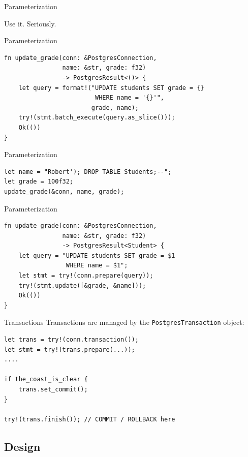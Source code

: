 \documentclass{beamer}
\begin{document}
\begin{frame}[fragile]{Parameterization}
    \begin{center}
        Use it. Seriously.
    \end{center}
\end{frame}

\begin{frame}[fragile]{Parameterization}
    \begin{verbatim}
fn update_grade(conn: &PostgresConnection,
                name: &str, grade: f32)
                -> PostgresResult<()> {
    let query = format!("UPDATE students SET grade = {}
                         WHERE name = '{}'",
                        grade, name);
    try!(stmt.batch_execute(query.as_slice()));
    Ok(())
}
    \end{verbatim}
\end{frame}

\begin{frame}[fragile]{Parameterization}
    \begin{verbatim}
let name = "Robert'); DROP TABLE Students;--";
let grade = 100f32;
update_grade(&conn, name, grade);
    \end{verbatim}
\end{frame}

\begin{frame}[fragile]{Parameterization}
    \begin{verbatim}
fn update_grade(conn: &PostgresConnection,
                name: &str, grade: f32)
                -> PostgresResult<Student> {
    let query = "UPDATE students SET grade = $1
                 WHERE name = $1";
    let stmt = try!(conn.prepare(query));
    try!(stmt.update([&grade, &name]));
    Ok(())
}
    \end{verbatim}
\end{frame}

\begin{frame}[fragile]{Transactions}
    Transactions are managed by the \verb!PostgresTransaction! object:
    \begin{verbatim}
let trans = try!(conn.transaction());
let stmt = try!(trans.prepare(...));
....

if the_coast_is_clear {
    trans.set_commit();
}

try!(trans.finish()); // COMMIT / ROLLBACK here
    \end{verbatim}
\end{frame}

\subsection{Design}
\end{document}
